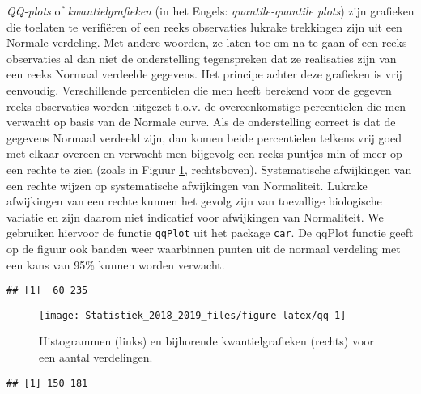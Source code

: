 \documentclass[12pt,dutch,coursenotes]{book}
\theoremstyle{definition}
\theoremstyle{definition}
\theoremstyle{definition}
\theoremstyle{remark}
\begin{document}
\emph{QQ-plots} of \emph{kwantielgrafieken} (in het Engels:
\emph{quantile-quantile plots}) zijn grafieken die toelaten te
verifiëren of een reeks observaties lukrake trekkingen zijn uit een
Normale verdeling. Met andere woorden, ze laten toe om na te gaan of een
reeks observaties al dan niet de onderstelling tegenspreken dat ze
realisaties zijn van een reeks Normaal verdeelde gegevens. Het principe
achter deze grafieken is vrij eenvoudig. Verschillende percentielen die
men heeft berekend voor de gegeven reeks observaties worden uitgezet
t.o.v. de overeenkomstige percentielen die men verwacht op basis van de
Normale curve. Als de onderstelling correct is dat de gegevens Normaal
verdeeld zijn, dan komen beide percentielen telkens vrij goed met elkaar
overeen en verwacht men bijgevolg een reeks puntjes min of meer op een
rechte te zien (zoals in Figuur \ref{fig:qq}, rechtsboven).
Systematische afwijkingen van een rechte wijzen op systematische
afwijkingen van Normaliteit. Lukrake afwijkingen van een rechte kunnen
het gevolg zijn van toevallige biologische variatie en zijn daarom niet
indicatief voor afwijkingen van Normaliteit. We gebruiken hiervoor de
functie \texttt{qqPlot} uit het package \texttt{car}. De qqPlot functie
geeft op de figuur ook banden weer waarbinnen punten uit de normaal
verdeling met een kans van 95\% kunnen worden verwacht.

\begin{verbatim}
## [1]  60 235
\end{verbatim}

\begin{figure}

{\centering \texttt{[image: Statistiek\_2018\_2019\_files/figure-latex/qq-1]} 

}

\caption{Histogrammen (links) en bijhorende kwantielgrafieken (rechts) voor een aantal verdelingen.}\label{fig:qq}
\end{figure}

\begin{verbatim}
## [1] 150 181
\end{verbatim}
\end{document}
